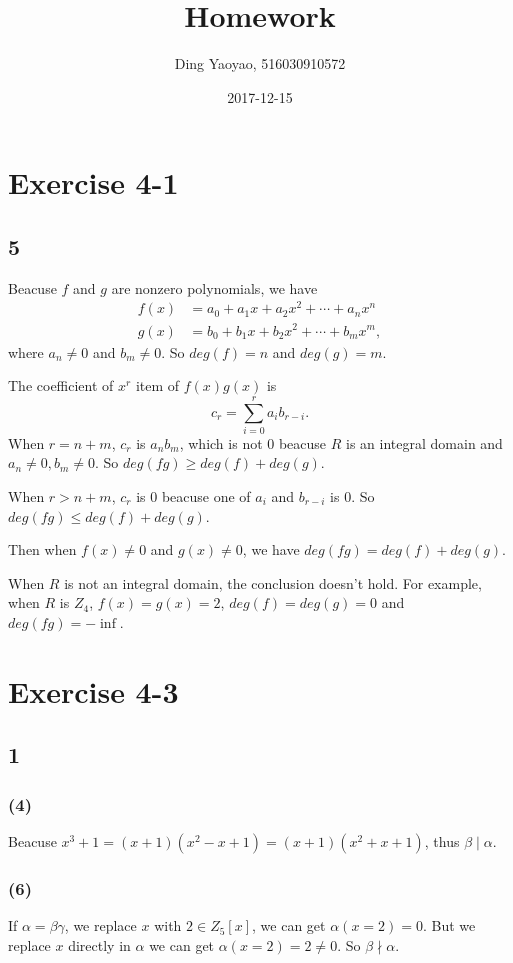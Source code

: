 \documentclass[draft]{article}
\title{Homework}
\date{2017-12-15}
\author{Ding Yaoyao, 516030910572}
\begin{document}
	\maketitle
	\section*{Exercise 4-1}
		\subsection*{5}
		Beacuse $f$ and $g$ are nonzero polynomials, we have
		\begin{equation*}
			\begin{split}
				f(x) & = a_0+a_1x+a_2x^2+\cdots+a_nx^n	\\
				g(x) & = b_0+b_1x+b_2x^2+\cdots+b_mx^m,
			\end{split}
		\end{equation*}
		where $a_n \neq 0$ and $b_m \neq 0$. So $deg(f) = n$ and $deg(g) = m$.

		The coefficient of $x^r$ item of $f(x)g(x)$ is 
		$$
		c_r = \sum_{i = 0}^{r}a_ib_{r-i}.
		$$
		When $r = n+m$, $c_r$ is $a_nb_m$, which is not $0$ beacuse $R$ is an integral
		domain and $a_n \neq 0, b_m \neq 0$. So $deg(fg) \geq deg(f) + deg(g)$.

		When $r > n + m$, $c_r$ is $0$ beacuse one of $a_i$ and $b_{r-i}$ is $0$.
		So $deg(fg) \leq deg(f) + deg(g)$. 

		Then when $f(x) \neq 0$ and $g(x) \neq 0$, we have $deg(fg) = deg(f) +
		deg(g)$.

		When $R$ is not an integral domain, the conclusion doesn't hold. For
		example, when $R$ is $Z_4$, $f(x) = g(x) = 2$, $deg(f) = deg(g) = 0$ and
		$deg(fg) = -\inf$.
	\section*{Exercise 4-3}
		\subsection*{1}
			\subsubsection*{(4)}
				Beacuse $x^3+1 = (x+1)(x^2-x+1) = (x+1)(x^2+x+1)$, thus $\beta \mid \alpha$.
			\subsubsection*{(6)}
				If $\alpha = \beta\gamma$, we replace $x$ with $2 \in Z_5[x]$, we can
				get $\alpha(x = 2) = 0$. But we replace $x$ directly in $\alpha$ we can
				get $\alpha(x = 2) = 2 \neq 0$. So $\beta \nmid \alpha$.
\end{document}
